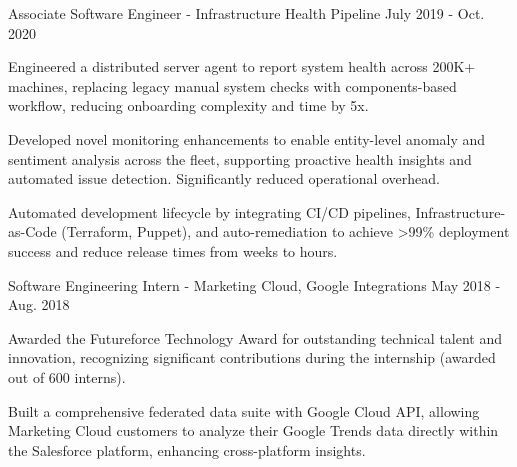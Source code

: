 \begin{cventries}
\cventry
  {Associate Software Engineer - Infrastructure Health Pipeline}
  {}
  {}
  {July 2019 - Oct. 2020}
  {
    \begin{cvitems}
      \item {Engineered a distributed server agent to report system health across 200K+ machines, replacing legacy manual system checks with components-based workflow, reducing onboarding complexity and time by 5x.}
      \item {Developed novel monitoring enhancements to enable entity-level anomaly and sentiment analysis across the fleet, supporting proactive health insights and automated issue detection. Significantly reduced operational overhead.}
      \item {Automated development lifecycle by integrating CI/CD pipelines, Infrastructure-as-Code (Terraform, Puppet), and auto-remediation to achieve >99\% deployment success and reduce release times from weeks to hours.}
    \end{cvitems}
  }

\cventry
  {Software Engineering Intern - Marketing Cloud, Google Integrations}
  {}
  {}
  {May 2018 - Aug. 2018}
  {
    \begin{cvitems}
      \item {Awarded the Futureforce Technology Award for outstanding technical talent and innovation, recognizing significant contributions during the internship (awarded out of 600 interns).}
      \item {Built a comprehensive federated data suite with Google Cloud API, allowing Marketing Cloud customers to analyze their Google Trends data directly within the Salesforce platform, enhancing cross-platform insights.}
    \end{cvitems}
  }

\end{cventries}